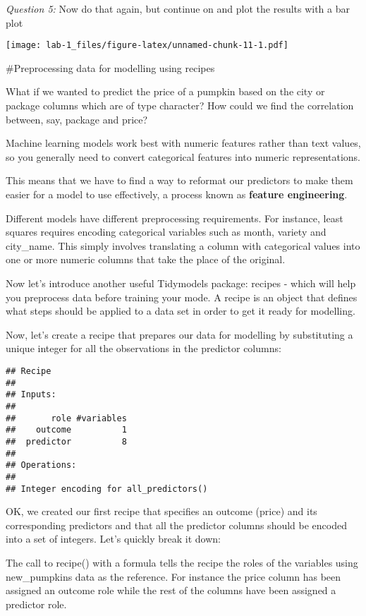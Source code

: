 \documentclass[
]{article}
\begin{document}
\emph{Question 5:} Now do that again, but continue on and plot the
results with a bar plot

\texttt{[image: lab-1\_files/figure-latex/unnamed-chunk-11-1.pdf]}

\#Preprocessing data for modelling using recipes

What if we wanted to predict the price of a pumpkin based on the city or
package columns which are of type character? How could we find the
correlation between, say, package and price?

Machine learning models work best with numeric features rather than text
values, so you generally need to convert categorical features into
numeric representations.

This means that we have to find a way to reformat our predictors to make
them easier for a model to use effectively, a process known as
\textbf{feature engineering}.

Different models have different preprocessing requirements. For
instance, least squares requires encoding categorical variables such as
month, variety and city\_name. This simply involves translating a column
with categorical values into one or more numeric columns that take the
place of the original.

Now let's introduce another useful Tidymodels package: recipes - which
will help you preprocess data before training your mode. A recipe is an
object that defines what steps should be applied to a data set in order
to get it ready for modelling.

Now, let's create a recipe that prepares our data for modelling by
substituting a unique integer for all the observations in the predictor
columns:

\begin{verbatim}
## Recipe
## 
## Inputs:
## 
##       role #variables
##    outcome          1
##  predictor          8
## 
## Operations:
## 
## Integer encoding for all_predictors()
\end{verbatim}

OK, we created our first recipe that specifies an outcome (price) and
its corresponding predictors and that all the predictor columns should
be encoded into a set of integers. Let's quickly break it down:

The call to recipe() with a formula tells the recipe the roles of the
variables using new\_pumpkins data as the reference. For instance the
price column has been assigned an outcome role while the rest of the
columns have been assigned a predictor role.
\end{document}
